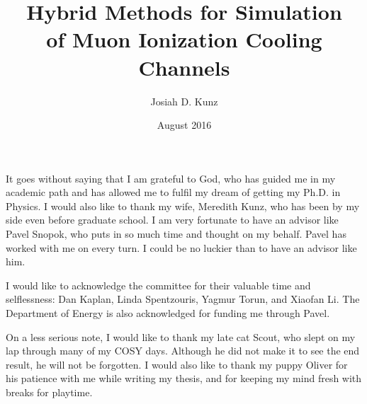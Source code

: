 \title{Hybrid Methods for Simulation\\
of Muon Ionization Cooling Channels}
\author{Josiah D. Kunz}
\date{August 2016}
\copyrightnoticefalse      %
\maketitle                %


\prelimpages         %


\begin{acknowledgement}

It goes without saying that I am grateful to God, who has guided me in my academic path and has allowed me to fulfil my dream of getting my Ph.D. in Physics. I would also like to thank my wife, Meredith Kunz, who has been by my side even before graduate school. I am very fortunate to have an advisor like Pavel Snopok, who puts in so much time and thought on my behalf. Pavel has worked with me on every turn. I could be no luckier than to have an advisor like him. 

I would like to acknowledge the committee for their valuable time and selflessness: Dan Kaplan, Linda Spentzouris, Yagmur Torun, and Xiaofan Li. The Department of Energy is also acknowledged for funding me through Pavel.

On a less serious note, I would like to thank my late cat Scout, who slept on my lap through many of my COSY days. Although he did not make it to see the end result, he will not be forgotten. I would also like to thank my puppy Oliver for his patience with me while writing my thesis, and for keeping my mind fresh with breaks for playtime.

\end{acknowledgement}


\tableofcontents
\clearpage

\listoftables

\clearpage

\listoffigures

\clearpage